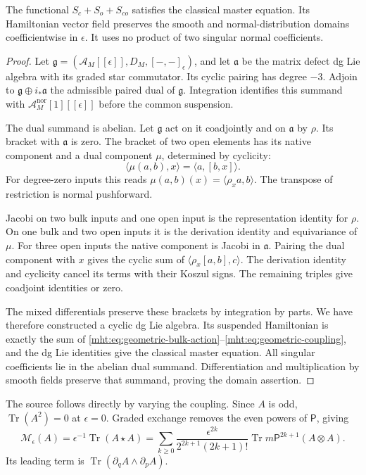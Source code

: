 \begin{theorem}\label{mht:thm:geometric-coupled-classical}
The functional $S_c+S_o+S_{co}$ satisfies the classical
master equation. Its Hamiltonian vector field preserves the
smooth and normal-distribution domains coefficientwise in
$\epsilon$. It uses no product of two singular normal
coefficients.
\end{theorem}
\begin{proof}
Let $\mathfrak g=(\mathcal A_M[[\epsilon]],D_M,[-,-]_\epsilon)$,
and let $\mathfrak a$ be the matrix defect dg Lie algebra with
its graded star commutator. Its cyclic pairing has degree $-3$.
Adjoin to $\mathfrak g\oplus i_*\mathfrak a$ the admissible
paired dual of $\mathfrak g$. Integration identifies this
summand with $\mathcal A_M^{\mathrm{nor}}[1][[\epsilon]]$
before the common suspension.

The dual summand is abelian. Let $\mathfrak g$ act on it
coadjointly and on $\mathfrak a$ by $\rho$. Its bracket
with $\mathfrak a$ is zero. The bracket of two open elements
has its native component and a dual component $\mu$, determined
by cyclicity:
\[
 \langle\mu(a,b),x\rangle=\langle a,[b,x]\rangle.
\]
For degree-zero inputs this reads
$\mu(a,b)(x)=\langle\rho_xa,b\rangle$.
The transpose of restriction is normal pushforward.

Jacobi on two bulk inputs and one open input is the
representation identity for $\rho$. On one bulk and two
open inputs it is the derivation identity and equivariance
of $\mu$. For three open inputs the native component is
Jacobi in $\mathfrak a$. Pairing the dual component with
$x$ gives the cyclic sum of $\langle\rho_x[a,b],c\rangle$.
The derivation identity and cyclicity cancel its terms with
their Koszul signs. The remaining triples give coadjoint
identities or zero.

The mixed differentials preserve these brackets by integration
by parts. We have therefore constructed a cyclic dg Lie
algebra. Its suspended Hamiltonian is exactly the sum of
\eqref{mht:eq:geometric-bulk-action}--\eqref{mht:eq:geometric-coupling},
and the dg Lie identities give the classical master equation.
All singular coefficients lie in the abelian dual summand.
Differentiation and multiplication by smooth fields preserve
that summand, proving the domain assertion.
\end{proof}

The source follows directly by varying the coupling. Since
$A$ is odd, $\operatorname{Tr}(A^2)=0$ at $\epsilon=0$.
Graded exchange removes the even powers of $\mathsf P$, giving
\begin{equation}\label{mht:eq:geometric-source-moment}
 \mathcal M_\epsilon(A)=\epsilon^{-1}\operatorname{Tr}(A\star A)
 =\sum_{k\geq0}\frac{\epsilon^{2k}}{2^{2k+1}(2k+1)!}
       \operatorname{Tr}m\mathsf P^{2k+1}(A\otimes A).
\end{equation}
Its leading term is $\operatorname{Tr}(\partial_qA\wedge\partial_pA)$.

